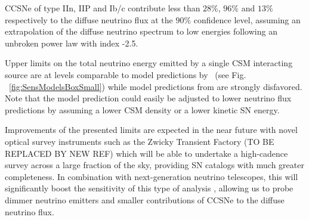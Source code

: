 \documentclass[twocolumn, tighten, linenumbers]{aastex62}
\begin{document}
CCSNe of type IIn, IIP and Ib/c contribute less than $28\%$, $96\%$ and $13\%$ respectively to the diffuse neutrino flux at the $90\%$ confidence level, assuming an extrapolation of the diffuse neutrino spectrum to low energies following an unbroken power law with index -2.5.

Upper limits on the total neutrino energy emitted by a single CSM interacting source are at levels comparable to model predictions by~\citet{Murase:2010cu} (see Fig. ~\ref{fig:SensModelsBoxSmall}) while model predictions from \citet{Zirakashvili:2015mua} are strongly disfavored. Note that the model prediction could easily be adjusted to lower neutrino flux predictions by assuming a lower CSM density or a lower kinetic SN energy. %



Improvements of the presented limits are expected in the near future with novel optical survey instruments such as the Zwicky Transient Factory \citep{2014htu..conf...27B} (TO BE REPLACED BY NEW REF) which will be able to undertake a high-cadence survey across a large fraction of the sky, providing SN catalogs with much greater completeness. In combination with next-generation neutrino telescopes, this will significantly boost the sensitivity of this type of analysis , allowing us to probe dimmer neutrino emitters and smaller contributions of CCSNe to the diffuse neutrino flux.

 

\appendix
\end{document}
